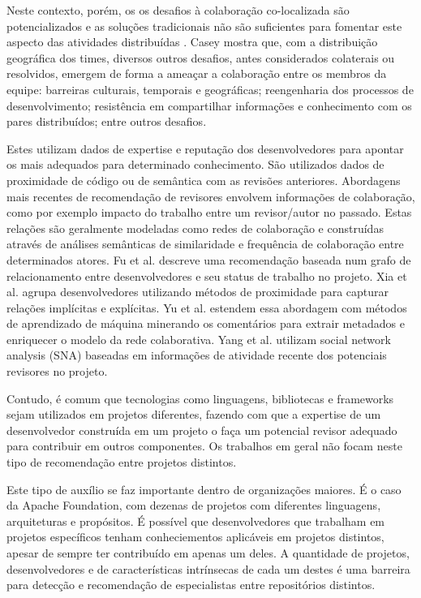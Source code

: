 \documentclass[sigconf]{acmart}
\begin{document}
Neste contexto, porém, os os desafios à colaboração co-localizada são potencializados e as soluções tradicionais não são suficientes para fomentar este aspecto das atividades distribuídas \cite{nicolaci2011}. Casey \cite{casey2010} mostra que, com a distribuição geográfica dos times, diversos outros desafios, antes considerados colaterais ou resolvidos, emergem de forma a ameaçar a colaboração entre os membros da equipe: barreiras culturais, temporais e geográficas; reengenharia dos processos de desenvolvimento; resistência em compartilhar informações e conhecimento com os pares distribuídos; entre outros desafios.

Estes utilizam dados de expertise e reputação dos desenvolvedores para apontar os mais adequados para determinado conhecimento. São utilizados dados de proximidade de código ou de semântica com as revisões anteriores. Abordagens mais recentes de recomendação de revisores envolvem informações de colaboração, como por exemplo impacto do trabalho entre um revisor/autor no passado. Estas relações são geralmente modeladas como redes de colaboração e construídas através de análises semânticas de similaridade e frequência de colaboração entre determinados atores. Fu et al. \cite{fu2017} descreve uma recomendação baseada num grafo de relacionamento entre desenvolvedores e seu status de trabalho no projeto. Xia et al. \cite{xia2017} agrupa desenvolvedores utilizando métodos de proximidade para capturar relações implícitas e explícitas. Yu et al. \cite{yu2014,yu2014-2} estendem essa abordagem com métodos de aprendizado de máquina minerando os comentários para extrair metadados e enriquecer o modelo da rede colaborativa. Yang et al. \cite{yang2016} utilizam social network analysis (SNA) baseadas em informações de atividade recente dos potenciais revisores no projeto.

Contudo, é comum que tecnologias como linguagens, bibliotecas e frameworks sejam utilizados em projetos diferentes, fazendo com que a expertise de um desenvolvedor construída em um projeto o faça um potencial revisor adequado para contribuir em outros componentes. Os trabalhos em geral não focam neste tipo de recomendação entre projetos distintos.

Este tipo de auxílio se faz importante dentro de organizações maiores. É o caso da Apache Foundation, com dezenas de projetos com diferentes linguagens, arquiteturas e propósitos. É possível que desenvolvedores que trabalham em projetos específicos tenham conheciementos aplicáveis em projetos distintos, apesar de sempre ter contribuído em apenas um deles. A quantidade de projetos, desenvolvedores e de características intrínsecas de cada um destes é uma barreira para detecção e recomendação de especialistas entre repositórios distintos.
\end{document}
